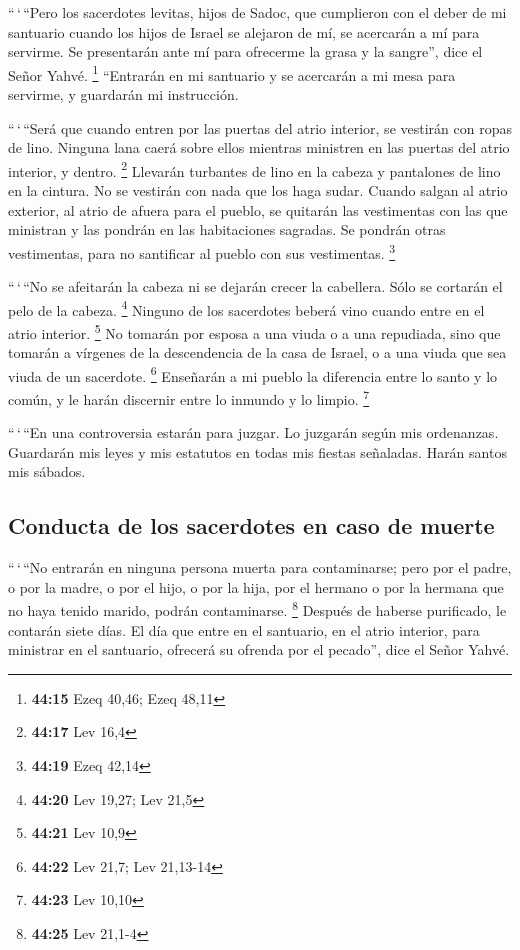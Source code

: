  ``\,`\,``Pero los sacerdotes levitas, hijos de Sadoc,
que cumplieron con el deber de mi santuario cuando los hijos de Israel
se alejaron de mí, se acercarán a mí para servirme. Se presentarán ante
mí para ofrecerme la grasa y la sangre'', dice el Señor Yahvé.
\footnote{\textbf{44:15} Ezeq 40,46; Ezeq 48,11} 
``Entrarán en mi santuario y se acercarán a mi mesa para servirme, y
guardarán mi instrucción.

 ``\,`\,``Será que cuando entren por las puertas del
atrio interior, se vestirán con ropas de lino. Ninguna lana caerá sobre
ellos mientras ministren en las puertas del atrio interior, y dentro.
\footnote{\textbf{44:17} Lev 16,4}  Llevarán turbantes de
lino en la cabeza y pantalones de lino en la cintura. No se vestirán con
nada que los haga sudar.  Cuando salgan al atrio
exterior, al atrio de afuera para el pueblo, se quitarán las vestimentas
con las que ministran y las pondrán en las habitaciones sagradas. Se
pondrán otras vestimentas, para no santificar al pueblo con sus
vestimentas. \footnote{\textbf{44:19} Ezeq 42,14}

 ``\,`\,``No se afeitarán la cabeza ni se dejarán crecer
la cabellera. Sólo se cortarán el pelo de la cabeza. \footnote{\textbf{44:20}
  Lev 19,27; Lev 21,5}  Ninguno de los sacerdotes beberá
vino cuando entre en el atrio interior. \footnote{\textbf{44:21} Lev
  10,9}  No tomarán por esposa a una viuda o a una
repudiada, sino que tomarán a vírgenes de la descendencia de la casa de
Israel, o a una viuda que sea viuda de un sacerdote. \footnote{\textbf{44:22}
  Lev 21,7; Lev 21,13-14}  Enseñarán a mi pueblo la
diferencia entre lo santo y lo común, y le harán discernir entre lo
inmundo y lo limpio. \footnote{\textbf{44:23} Lev 10,10}

 ``\,`\,``En una controversia estarán para juzgar. Lo
juzgarán según mis ordenanzas. Guardarán mis leyes y mis estatutos en
todas mis fiestas señaladas. Harán santos mis sábados.

\hypertarget{conducta-de-los-sacerdotes-en-caso-de-muerte}{%
\subsection{Conducta de los sacerdotes en caso de
muerte}\label{conducta-de-los-sacerdotes-en-caso-de-muerte}}

 ``\,`\,``No entrarán en ninguna persona muerta para
contaminarse; pero por el padre, o por la madre, o por el hijo, o por la
hija, por el hermano o por la hermana que no haya tenido marido, podrán
contaminarse. \footnote{\textbf{44:25} Lev 21,1-4} 
Después de haberse purificado, le contarán siete días. 
El día que entre en el santuario, en el atrio interior, para ministrar
en el santuario, ofrecerá su ofrenda por el pecado'', dice el Señor
Yahvé.

